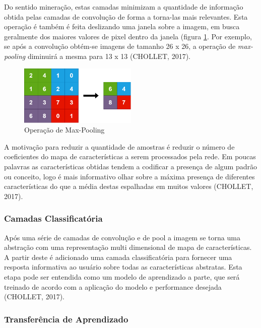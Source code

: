 \documentclass[12pt]{report}
\begin{document}
Do sentido mineração, estas camadas minimizam a quantidade de informação obtida pelas camadas de convolução de forma a torna-las mais relevantes. Esta operação é também é feita deslizando uma janela sobre a imagem, em busca geralmente dos maiores valores de pixel dentro da janela (figura \ref{fig:maxpool}.  Por exemplo, se após a convolução obtém-se imagens de tamanho 26 x 26, a operação de \textit{max-pooling} diminuirá a mesma para 13 x 13 (CHOLLET, 2017).

\begin{figure}
    \centering
    \includegraphics[width=0.5\textwidth]{images/maxpool.png}
    \caption{Operação de Max-Pooling}
    \label{fig:maxpool}
\end{figure}

A motivação para reduzir a quantidade de amostras é reduzir o número de coeficientes do mapa de características a serem processados pela rede. Em poucas palavras as características obtidas tendem a codificar a presença de algum padrão ou conceito, logo é mais informativo olhar sobre a máxima presença de diferentes características do que a média destas espalhadas em muitos valores (CHOLLET, 2017).

\subsubsection{Camadas Classificatória}

Após uma série de camadas de convolução e de pool a imagem se torna uma abstração com uma representação multi dimensional de mapa de características. A partir deste é adicionado uma camada classificatória para fornecer uma resposta informativa ao usuário sobre todas as características abstratas. Esta etapa pode ser entendida como um modelo de aprendizado a parte, que será treinado de acordo com a aplicação do modelo e performance desejada (CHOLLET, 2017).

\subsubsection{Transferência de Aprendizado}
\end{document}
